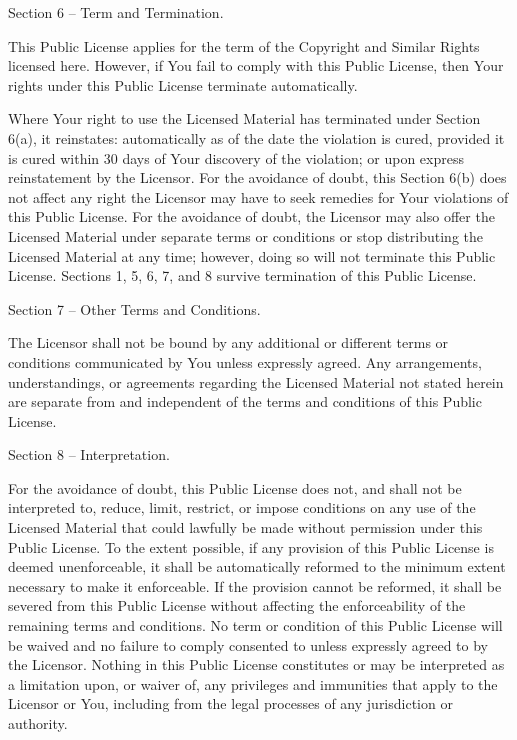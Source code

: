 Section 6 – Term and Termination.

    This Public License applies for the term of the Copyright and Similar Rights licensed here. However, if You fail to comply with this Public License, then Your rights under this Public License terminate automatically.

    Where Your right to use the Licensed Material has terminated under Section 6(a), it reinstates:
        automatically as of the date the violation is cured, provided it is cured within 30 days of Your discovery of the violation; or
        upon express reinstatement by the Licensor.
    For the avoidance of doubt, this Section 6(b) does not affect any right the Licensor may have to seek remedies for Your violations of this Public License.
    For the avoidance of doubt, the Licensor may also offer the Licensed Material under separate terms or conditions or stop distributing the Licensed Material at any time; however, doing so will not terminate this Public License.
    Sections 1, 5, 6, 7, and 8 survive termination of this Public License.

Section 7 – Other Terms and Conditions.

    The Licensor shall not be bound by any additional or different terms or conditions communicated by You unless expressly agreed.
    Any arrangements, understandings, or agreements regarding the Licensed Material not stated herein are separate from and independent of the terms and conditions of this Public License.

Section 8 – Interpretation.

    For the avoidance of doubt, this Public License does not, and shall not be interpreted to, reduce, limit, restrict, or impose conditions on any use of the Licensed Material that could lawfully be made without permission under this Public License.
    To the extent possible, if any provision of this Public License is deemed unenforceable, it shall be automatically reformed to the minimum extent necessary to make it enforceable. If the provision cannot be reformed, it shall be severed from this Public License without affecting the enforceability of the remaining terms and conditions.
    No term or condition of this Public License will be waived and no failure to comply consented to unless expressly agreed to by the Licensor.
    Nothing in this Public License constitutes or may be interpreted as a limitation upon, or waiver of, any privileges and immunities that apply to the Licensor or You, including from the legal processes of any jurisdiction or authority.

